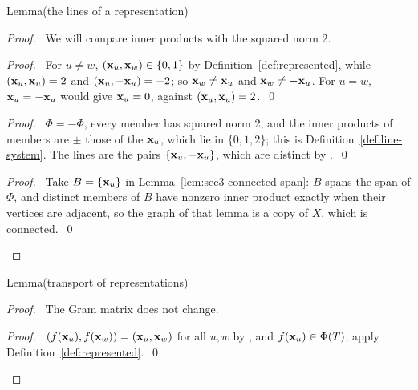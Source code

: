 \begin{namedresult}{Lemma}{(the lines of a representation)}\label{lem:4-lines}
\end{namedresult}
\begin{proof}
 \pfsketch\ We will compare inner products with the squared norm 2.
 \begin{proof}\pf\ For $u\ne w$, $({\mathbf x}_u,{\mathbf x}_w)\in\{0,1\}$ by Definition~\ref{def:represented},
  while $({\mathbf x}_u,{\mathbf x}_u)=2$ and $({\mathbf x}_u,-{\mathbf x}_u)=-2$; so ${\mathbf x}_w\ne{\mathbf x}_u$ and ${\mathbf x}_w\ne-{\mathbf x}_u$. For
  $u=w$, ${\mathbf x}_u=-{\mathbf x}_u$ would give ${\mathbf x}_u=0$, against $({\mathbf x}_u,{\mathbf x}_u)=2$.~\qed\end{proof}
 \begin{proof}\pf\ $\Phi=-\Phi$, every member has squared norm 2, and the inner products of
  members are $\pm$ those of the ${\mathbf x}_u$, which lie in $\{0,1,2\}$; this is
  Definition~\ref{def:line-system}. The lines are the pairs $\{{\mathbf x}_u,-{\mathbf x}_u\}$, which are
  distinct by .~\qed\end{proof}
 \qedstep
 \begin{proof}\pf\ Take $B=\{{\mathbf x}_u\}$ in Lemma~\ref{lem:sec3-connected-span}: $B$ spans the span
  of $\Phi$, and distinct members of $B$ have nonzero inner product exactly when their vertices
  are adjacent, so the graph of that lemma is a copy of $X$, which is connected.~\qed\end{proof}
\end{proof}

\begin{namedresult}{Lemma}{(transport of representations)}\label{lem:4-transport}
\end{namedresult}
\begin{proof}
 \pfsketch\ The Gram matrix does not change.
 \qedstep
 \begin{proof}\pf\ $(f({\mathbf x}_u),f({\mathbf x}_w))=({\mathbf x}_u,{\mathbf x}_w)$ for all $u,w$ by , and
  $f({\mathbf x}_u)\in\Phi(T)$; apply Definition~\ref{def:represented}.~\qed\end{proof}
\end{proof}

